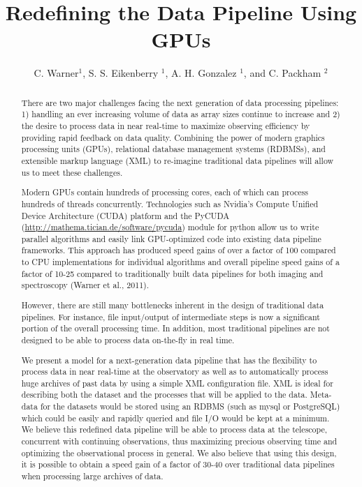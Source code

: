 \documentclass[11pt,twoside]{article}
\begin{document}
\title{Redefining the Data Pipeline Using GPUs}
\author{C. Warner$^1$, S. S. Eikenberry $^1$, A. H. Gonzalez $^1$, and C. Packham $^2$
}

\begin{abstract}
There are two major challenges facing the next generation of data processing pipelines: 1) handling an ever increasing volume of data as array sizes continue to increase and 2) the desire to process data in near real-time to maximize observing efficiency by providing rapid feedback on data quality.  Combining the power of modern graphics processing units (GPUs), relational database management systems (RDBMSs), and extensible markup language (XML) to re-imagine traditional data pipelines will allow us to meet these challenges.

Modern GPUs contain hundreds of processing cores, each of which can process hundreds of threads concurrently.  Technologies such as Nvidia's Compute Unified Device Architecture (CUDA) platform and the PyCUDA (\url{http://mathema.tician.de/software/pycuda}) module for python allow us to write parallel algorithms and easily link GPU-optimized code into existing data pipeline frameworks.  This approach has produced speed gains of over a factor of 100 compared to CPU implementations for individual algorithms and overall pipeline speed gains of a factor of 10-25 compared to traditionally built data pipelines for both imaging and spectroscopy (Warner et al., 2011).

However, there are still many bottlenecks inherent in the design of traditional data pipelines.  For instance, file input/output of intermediate steps is now a significant portion of the overall processing time.  In addition, most traditional pipelines are not designed to be able to process data on-the-fly in real time.

We present a model for a next-generation data pipeline that has the flexibility to process data in near real-time at the observatory as well as to automatically process huge archives of past data by using a simple XML configuration file.  XML is ideal for describing both the dataset and the processes that will be applied to the data.  Meta-data for the datasets would be stored using an RDBMS (such as mysql or PostgreSQL) which could be easily and rapidly queried and file I/O would be kept at a minimum.  We believe this redefined data pipeline will be able to process data at the telescope, concurrent with continuing observations, thus maximizing precious observing time and optimizing the observational process in general.  We also believe that using this design, it is possible to obtain a speed gain of a factor of 30-40 over traditional data pipelines when processing large archives of data.
\end{abstract}
\end{document}
